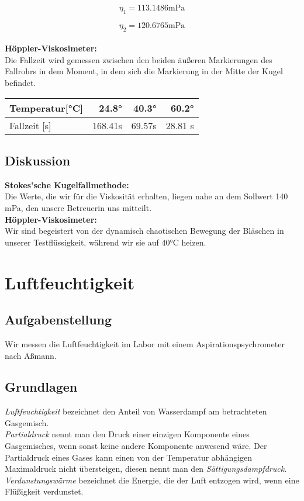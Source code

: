 \documentclass{article}
\begin{document}
$$  \eta_1 =   113.1486 \text{mPa} $$ 
 
$$  \eta_2 =   120.6765 \text{mPa} $$ \\
\textbf{Höppler-Viskosimeter:}\\
Die Fallzeit wird gemessen zwischen den beiden äußeren Markierungen des Fallrohrs in dem Moment, in dem sich die Markierung in der Mitte der Kugel befindet.\\
\begin{center}
\begin{table}
\begin{tabular}{|l|r||r||r|}
\hline
Temperatur[°C] & 24.8° & 40.3° & 60.2° \\
\hline Fallzeit [s] & 168.41s & 69.57s &  28.81 s \\
\hline
\end{tabular}
\end{table}
\end{center}

\subsection{Diskussion}
\textbf{Stokes'sche Kugelfallmethode:}\\

Die Werte, die wir für die Viskosität erhalten, liegen nahe an dem Sollwert 140 mPa, den unsere Betreuerin uns mitteilt. 
\\
\textbf{Höppler-Viskosimeter:}\\
Wir sind begeistert von der dynamisch chaotischen Bewegung der Bläschen in unserer Testflüssigkeit, während wir sie auf 40°C heizen.
\section{Luftfeuchtigkeit}
\subsection{Aufgabenstellung}
Wir messen die Luftfeuchtigkeit im Labor mit einem Aspirationspsychrometer nach Aßmann.
\subsection{Grundlagen}
\textit{Luftfeuchtigkeit} bezeichnet den Anteil von Wasserdampf am betrachteten Gasgemisch. \\
\textit{Partialdruck} nennt man den Druck einer einzigen Komponente eines Gasgemisches, wenn sonst keine andere Komponente anwesend wäre. Der Partialdruck eines Gases kann einen von der Temperatur abhängigen Maximaldruck nicht übersteigen, diesen nennt man den \textit{Sättigungsdampfdruck.}	\\
\textit{Verdunstungswärme} bezeichnet die Energie, die der Luft entzogen wird, wenn eine Flüßigkeit verdunstet. \\
\end{document}

